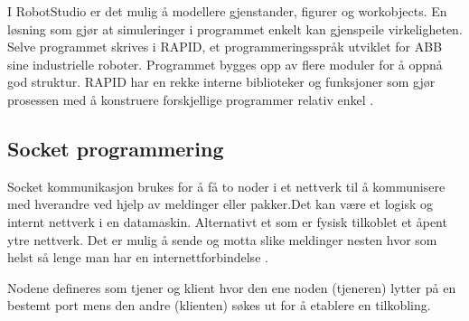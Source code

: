 \documentclass[conference]{IEEEtran}
\begin{document}
        I RobotStudio er det mulig å modellere gjenstander, figurer og workobjects. En løsning som gjør at simuleringer i programmet enkelt kan 
        gjenspeile virkeligheten. Selve programmet skrives i RAPID, et programmeringsspråk utviklet for ABB sine industrielle roboter. 
        Programmet bygges opp av flere moduler for å oppnå god struktur. RAPID har en rekke interne biblioteker og funksjoner som gjør prosessen 
        med å konstruere forskjellige programmer relativ enkel \cite{teori:RobStud} \cite{teori:RobStud1}. 

    \subsection{Socket programmering}
        Socket kommunikasjon brukes for å få to noder i et nettverk til å kommunisere med hverandre ved hjelp av meldinger eller pakker.Det kan være 
        et logisk og internt nettverk i en datamaskin. Alternativt et som er fysisk tilkoblet et åpent ytre nettverk. Det er mulig å sende og motta 
        slike meldinger nesten hvor som helst så lenge man har en internettforbindelse \cite{teori:socket}.

        Nodene defineres som tjener og klient hvor den ene noden (tjeneren) lytter på en bestemt port mens den andre (klienten) søkes ut for å etablere 
        en tilkobling.
\end{document}
